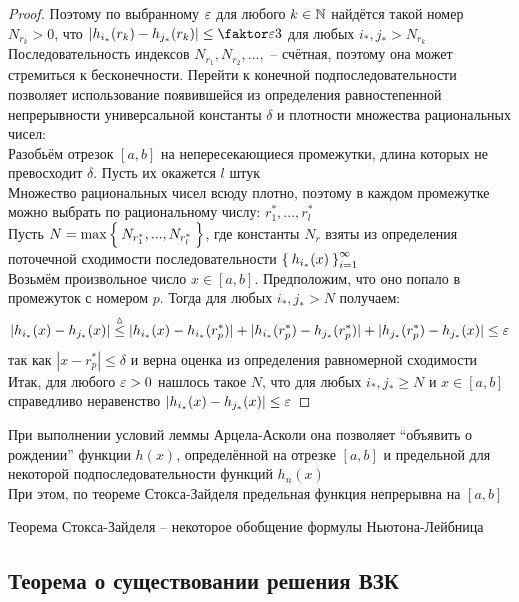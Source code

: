 \begin{proof}
    Поэтому по выбранному $ \varepsilon $ для любого $ k \in \mathbb{N} $ найдётся такой номер $ N_{r_k} > 0 $, что $ |h_{i_*}(r_k) - h_{j_*}(r_k)| \le \faktor\veps3 $ для любых $ i_*, j_* > N_{r_k} $ \\
    Последовательность индексов $ N_{r_1}, N_{r_2}, ..., $ -- счётная, поэтому она может стремиться к бесконечности. Перейти к конечной подпоследовательности позволяет использование появившейся из определения равностепенной непрерывности универсальной константы $ \delta $ и плотности множества рациональных чисел: \\
    Разобьём отрезок $ [a, b] $ на непересекающиеся промежутки, длина которых не превосходит $ \delta $. Пусть их окажется $ l $ штук \\
    Множество рациональных чисел всюду плотно, поэтому в каждом промежутке можно выбрать по рациональному числу: $ r_1^*, ..., r_l^* $ \\
    Пусть $ N = \max\Set{N_{r_1^*}, ..., N_{r_l^*}} $, где константы $ N_r $ взяты из определения поточечной сходимости последовательности $ \Set{h_{i_*}(x)}_{i=1}^{\infty} $ \\
    Возьмём произвольное число $ x \in [a, b] $. Предположим, что оно попало в промежуток с номером $ p $. Тогда для любых $ i_*, j_* > N $ получаем:
    $$ |h_{i_*}(x) - h_{j_*}(x)| \stackrel\vartriangle\le |h_{i_*}(x) - h_{i_*}(r_p^*)| + |h_{i_*}(r_p^*) - h_{j_*}(r_p^*)| + |h_{j_*}(r_p^*) - h_{j_*}(x)| \le \varepsilon $$
    так как $ |x - r_p^*| \le \delta $ и верна оценка из определения равномерной сходимости \\
    Итак, для любого $ \varepsilon > 0 $ нашлось такое $ N $, что для любых $ i_*, j_* \ge N $ и $ x \in [a, b] $ справедливо неравенство $ |h_{i_*}(x) - h_{j_*}(x)| \le \varepsilon $
\end{proof}

\begin{remark}
	При выполнении условий леммы Арцела-Асколи она позволяет ``объявить о рождении'' функции $ h(x) $, определённой на отрезке $ [a, b] $ и предельной для некоторой подпоследовательности функций $ h_n(x) $ \\
    При этом, по теореме Стокса-Зайделя предельная функция непрерывна на $ [a, b] $
\end{remark}

\begin{note}
	Теорема Стокса-Зайделя -- некоторое обобщение формулы Ньютона-Лейбница
\end{note}

\subsection{Теорема о существовании решения ВЗК}


